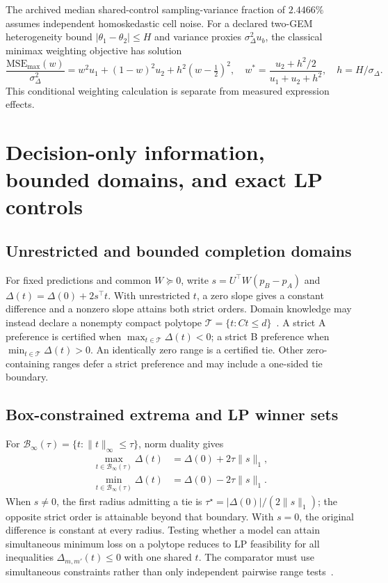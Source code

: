 The archived median shared-control sampling-variance fraction of $2.4466\%$ assumes independent homoskedastic cell noise. For a declared two-GEM heterogeneity bound $|\theta_1-\theta_2|\le H$ and variance proxies $\sigma_\Delta^2u_b$, the classical minimax weighting objective has solution
\[
\frac{\mathrm{MSE}_{\max}(w)}{\sigma_\Delta^2}=w^2u_1+(1-w)^2u_2+h^2(w-\tfrac12)^2,
\quad w^*=\frac{u_2+h^2/2}{u_1+u_2+h^2},\quad h=H/\sigma_\Delta.
\]
This conditional weighting calculation is separate from measured expression effects.

\par
\section{Decision-only information, bounded domains, and exact LP controls}
\label{supp:decision}
\subsection{Unrestricted and bounded completion domains}
For fixed predictions and common $W\succeq0$, write $s=U^\top W(p_B-p_A)$ and $\Delta(t)=\Delta(0)+2s^\top t$. With unrestricted $t$, a zero slope gives a constant difference and a nonzero slope attains both strict orders. Domain knowledge may instead declare a nonempty compact polytope $\mathcal T=\{t:Ct\le d\}$~\cite{vanwaarde2020informativity,bennouna2025decision,ye2026decisionsufficient}. A strict A preference is certified when $\max_{t\in\mathcal T}\Delta(t)<0$; a strict B preference when $\min_{t\in\mathcal T}\Delta(t)>0$. An identically zero range is a certified tie. Other zero-containing ranges defer a strict preference and may include a one-sided tie boundary.

\subsection{Box-constrained extrema and LP winner sets}
For $\mathcal B_\infty(\tau)=\{t:\|t\|_\infty\le\tau\}$, norm duality gives
\begin{equation}\label{eq:polytope-s}
\begin{aligned}
\max_{t\in\mathcal B_\infty(\tau)}\Delta(t)&=\Delta(0)+2\tau\|s\|_1,\\
\min_{t\in\mathcal B_\infty(\tau)}\Delta(t)&=\Delta(0)-2\tau\|s\|_1.
\end{aligned}
\end{equation}
When $s\ne0$, the first radius admitting a tie is $\tau^\star=|\Delta(0)|/(2\|s\|_1)$; the opposite strict order is attainable beyond that boundary. With $s=0$, the original difference is constant at every radius. Testing whether a model can attain simultaneous minimum loss on a polytope reduces to LP feasibility for all inequalities $\Delta_{m,m'}(t)\le0$ with one shared $t$. The comparator must use simultaneous constraints rather than only independent pairwise range tests~\cite{boyd2004convex,kossen2021activetesting}.

